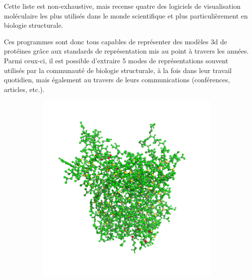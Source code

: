 Cette liste est non-exhaustive, mais recense quatre des logiciels de visualisation moléculaire les plus utilisés dans le monde scientifique et plus particulièrement en biologie structurale.

Ces programmes sont donc tous capables de représenter des modèles 3d de protéines grâce aux standards de représentation mis au point à travers les années. Parmi ceux-ci, il est possible d'extraire 5 modes de représentations souvent utilisés par la communauté de biologie structurale, à la fois dans leur travail quotidien, mais également au travers de leurs communications (conférences, articles, etc.).

\begin{figure}
  \begin{subfigure}{.5\textwidth}
  \centering
  {\includegraphics[width=0.9\linewidth]{./figures/ch1/ball_sticks_representation}}
    \label{Fig:ball_sticks_representation}
  \caption{}
  \end{subfigure}%
  \begin{subfigure}{.5\textwidth}
  \centering

\end{subfigure}
\end{figure}
